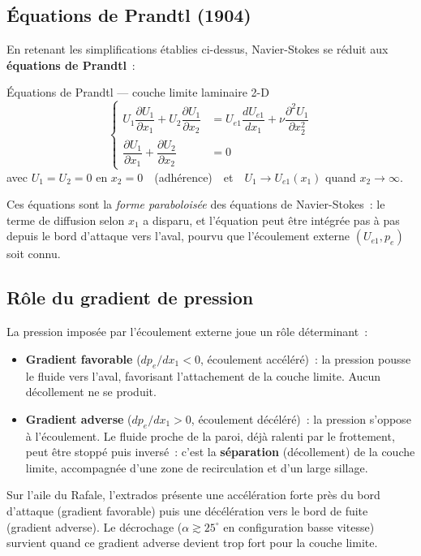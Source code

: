 \documentclass[11pt,a4paper]{report}
\newcommand{\pd}[2]{\dfrac{\partial #1}{\partial #2}}
\begin{document}
\subsection{\'Equations de Prandtl (1904)}

En retenant les simplifications \'etablies ci-dessus, Navier-Stokes se r\'eduit aux
\textbf{\'equations de Prandtl}~:

\begin{importantbox}{\'Equations de Prandtl --- couche limite laminaire 2-D}
\[
  \left\{\begin{aligned}
    U_1\pd{U_1}{x_1} + U_2\pd{U_1}{x_2}
      &= U_{e1}\dfrac{dU_{e1}}{dx_1} + \nu\pd{^2U_1}{x_2^2}\\[8pt]
    \pd{U_1}{x_1} + \pd{U_2}{x_2} &= 0
  \end{aligned}\right.
\]
avec $U_1 = U_2 = 0$ en $x_2 = 0$~~(adh\'erence)~~et~~$U_1\to U_{e1}(x_1)$ quand
$x_2\to\infty$.
\end{importantbox}

Ces \'equations sont la \emph{forme parabolois\'ee} des \'equations de Navier-Stokes~:
le terme de diffusion selon $x_1$ a disparu, et l'\'equation peut \^etre int\'egr\'ee
pas \`a pas depuis le bord d'attaque vers l'aval, pourvu que l'\'ecoulement externe
$(U_{e1}, p_e)$ soit connu.

\subsection{R\^ole du gradient de pression}

La pression impos\'ee par l'\'ecoulement externe joue un r\^ole d\'eterminant~:
\begin{itemize}
  \item \textbf{Gradient favorable} ($dp_e/dx_1 < 0$, \'ecoulement acc\'el\'er\'e)~:
    la pression pousse le fluide vers l'aval, favorisant l'attachement de la couche limite.
    Aucun d\'ecollement ne se produit.
  \item \textbf{Gradient adverse} ($dp_e/dx_1 > 0$, \'ecoulement d\'ec\'el\'er\'e)~:
    la pression s'oppose \`a l'\'ecoulement. Le fluide proche de la paroi, d\'ej\`a
    ralenti par le frottement, peut \^etre stopp\'e puis invers\'e~: c'est la
    \textbf{s\'eparation} (d\'ecollement) de la couche limite, accompagn\'ee d'une zone
    de recirculation et d'un large sillage.
\end{itemize}

Sur l'aile du Rafale, l'extrados pr\'esente une acc\'el\'eration forte pr\`es du bord
d'attaque (gradient favorable) puis une d\'ec\'el\'eration vers le bord de fuite (gradient
adverse). Le d\'ecrochage ($\alpha\gtrsim 25^\circ$ en configuration basse vitesse)
survient quand ce gradient adverse devient trop fort pour la couche limite.
\end{document}
